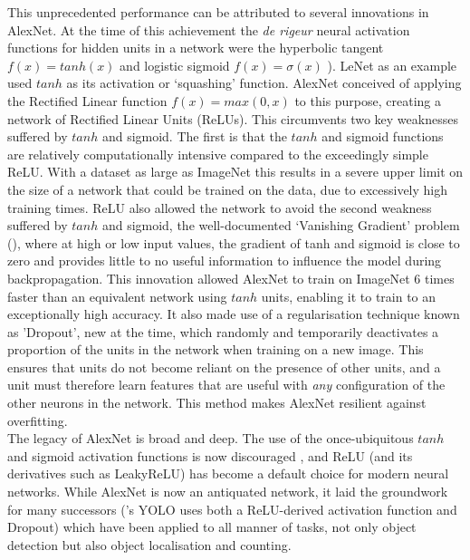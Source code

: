 This unprecedented performance can be attributed to several innovations in AlexNet. At the time of this achievement the \textit{de rigeur} neural activation functions for hidden units in a network were the hyperbolic tangent \(f(x) = tanh(x)\) and logistic sigmoid \(f(x)=\sigma(x)\) \cite[p. 191]{Goodfellow-et-al-2016}). LeNet as an example used \(tanh\) as its activation or ‘squashing’ function. AlexNet conceived of applying the Rectified Linear function \(f(x)=max(0,x)\) to this purpose, creating a network of Rectified Linear Units (ReLUs). This circumvents two key weaknesses suffered by \(tanh\) and sigmoid. The first is that the \(tanh\) and sigmoid functions are relatively computationally intensive compared to the exceedingly simple ReLU. With a dataset as large as ImageNet this results in a severe upper limit on the size of a network that could be trained on the data, due to excessively high training times. ReLU also allowed the network to avoid the second weakness suffered by \(tanh\) and sigmoid, the well-documented ‘Vanishing Gradient’ problem (\cite{Dying-ReLU}), where at high or low input values, the gradient of tanh and sigmoid is close to zero and provides little to no useful information to influence the model during backpropagation. This innovation allowed AlexNet to train on ImageNet 6 times faster than an equivalent network using \(tanh\) units, enabling it to train to an exceptionally high accuracy. It also made use of a regularisation technique known as 'Dropout', new at the time, which randomly and temporarily deactivates a proportion of the units in the network when training on a new image. This ensures that units do not become reliant on the presence of other units, and a unit must therefore learn features that are useful with \textit{any} configuration of the other neurons in the network. This method makes AlexNet resilient against overfitting.\\

The legacy of AlexNet is broad and deep. The use of the once-ubiquitous \(tanh\) and sigmoid activation functions is now discouraged \cite[p. 191]{Goodfellow-et-al-2016}, and ReLU (and its derivatives such as LeakyReLU) has become a default choice for modern neural networks. While AlexNet is now an antiquated network, it laid the groundwork for many successors (\cite{redmon2016look}'s YOLO uses both a ReLU-derived activation function and Dropout) which have been applied to all manner of tasks, not only object detection but also object localisation and counting.


